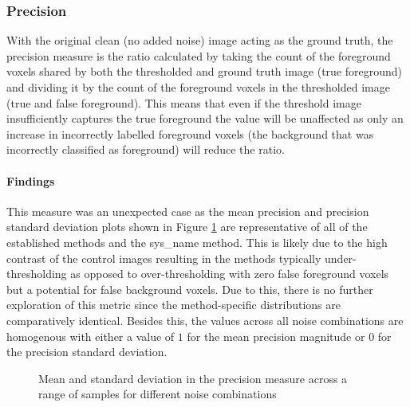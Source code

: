 \subsubsection{Precision}
With the original clean (no added noise) image acting as the ground truth, the precision measure is the ratio calculated by taking the count of the foreground voxels shared by both the thresholded and ground truth image (true foreground) and dividing it by the count of the foreground voxels in the thresholded image (true and false foreground). This means that even if the threshold image insufficiently captures the true foreground the value will be unaffected as only an increase in incorrectly labelled foreground voxels (the background that was incorrectly classified as foreground) will reduce the ratio.
\paragraph{Findings}
This measure was an unexpected case as the mean precision and precision standard deviation plots shown in Figure \ref{fig:precision_showcase} are representative of all of the established methods and the \gls{sys_name} method. This is likely due to the high contrast of the control images resulting in the methods typically under-thresholding as opposed to over-thresholding with zero false foreground voxels but a potential for false background voxels. Due to this, there is no further exploration of this metric since the method-specific distributions are comparatively identical. Besides this, the values across all noise combinations are homogenous with either a value of $1$ for the mean precision magnitude or $0$ for the precision standard deviation.
\begin{figure}[h!]
    \centering
    \caption{Mean and standard deviation in the precision measure across a range of samples for different noise combinations}
    \label{fig:precision_showcase}
\end{figure}

